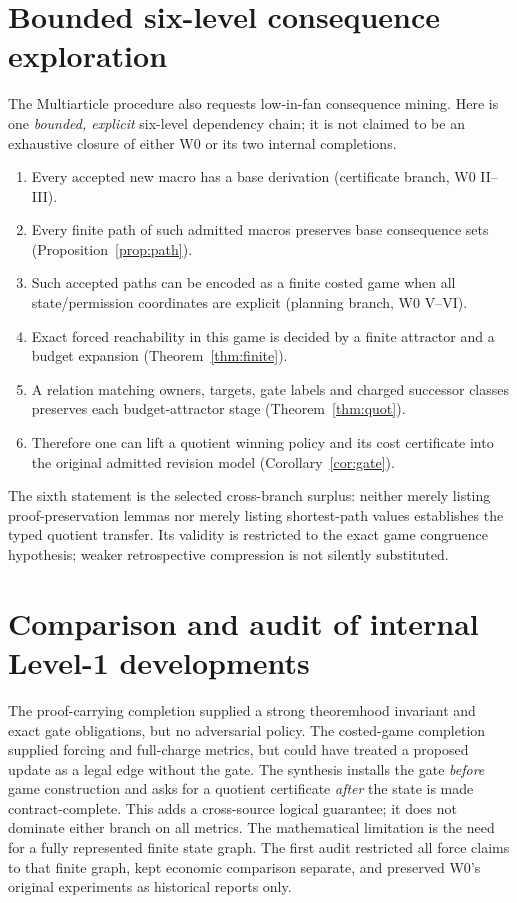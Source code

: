 \documentclass[11pt,letterpaper]{article}
\theoremstyle{definition}
\theoremstyle{remark}
\begin{document}
\section{Bounded six-level consequence exploration}
The Multiarticle procedure also requests low-in-fan consequence mining. Here is one \emph{bounded, explicit} six-level dependency chain; it is not claimed to be an exhaustive closure of either W0 or its two internal completions.
\begin{enumerate}[label=+\arabic*.]
\item Every accepted new macro has a base derivation (certificate branch, W0 II--III).
\item Every finite path of such admitted macros preserves base consequence sets (Proposition~\ref{prop:path}).
\item Such accepted paths can be encoded as a finite costed game when all state/permission coordinates are explicit (planning branch, W0 V--VI).
\item Exact forced reachability in this game is decided by a finite attractor and a budget expansion (Theorem~\ref{thm:finite}).
\item A relation matching owners, targets, gate labels and charged successor classes preserves each budget-attractor stage (Theorem~\ref{thm:quot}).
\item Therefore one can lift a quotient winning policy and its cost certificate into the original admitted revision model (Corollary~\ref{cor:gate}).
\end{enumerate}
The sixth statement is the selected cross-branch surplus: neither merely listing proof-preservation lemmas nor merely listing shortest-path values establishes the typed quotient transfer. Its validity is restricted to the exact game congruence hypothesis; weaker retrospective compression is not silently substituted.

\section{Comparison and audit of internal Level-1 developments}
The proof-carrying completion supplied a strong theoremhood invariant and exact gate obligations, but no adversarial policy. The costed-game completion supplied forcing and full-charge metrics, but could have treated a proposed update as a legal edge without the gate. The synthesis installs the gate \emph{before} game construction and asks for a quotient certificate \emph{after} the state is made contract-complete. This adds a cross-source logical guarantee; it does not dominate either branch on all metrics. The mathematical limitation is the need for a fully represented finite state graph. The first audit restricted all force claims to that finite graph, kept economic comparison separate, and preserved W0's original experiments as historical reports only.
\end{document}
